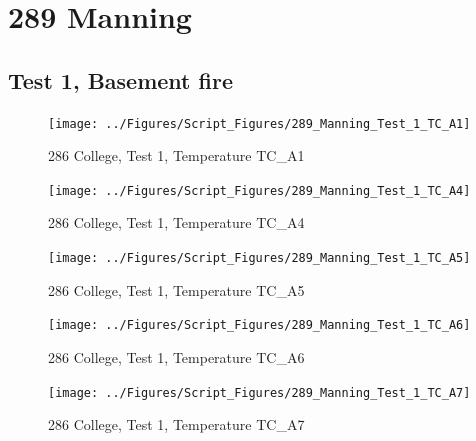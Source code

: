 \documentclass[12pt,oneside]{book}
\begin{document}



\clearpage


\section{289 Manning}

\subsection{Test 1, Basement fire}

\begin{figure}[!ht]
\texttt{[image: ../Figures/Script\_Figures/289\_Manning\_Test\_1\_TC\_A1]}
\caption{286 College, Test 1, Temperature TC\_A1}
\label{fig:289_Manning_Test_1_TC_A1}
\end{figure}

\begin{figure}[!ht]
\texttt{[image: ../Figures/Script\_Figures/289\_Manning\_Test\_1\_TC\_A4]}
\caption{286 College, Test 1, Temperature TC\_A4}
\label{fig:289_Manning_Test_1_TC_A4}
\end{figure}

\begin{figure}[!ht]
\texttt{[image: ../Figures/Script\_Figures/289\_Manning\_Test\_1\_TC\_A5]}
\caption{286 College, Test 1, Temperature TC\_A5}
\label{fig:289_Manning_Test_1_TC_A5}
\end{figure}

\begin{figure}[!ht]
\texttt{[image: ../Figures/Script\_Figures/289\_Manning\_Test\_1\_TC\_A6]}
\caption{286 College, Test 1, Temperature TC\_A6}
\label{fig:289_Manning_Test_1_TC_A6}
\end{figure}

\begin{figure}[!ht]
\texttt{[image: ../Figures/Script\_Figures/289\_Manning\_Test\_1\_TC\_A7]}
\caption{286 College, Test 1, Temperature TC\_A7}
\label{fig:289_Manning_Test_1_TC_A7}
\end{figure}
\end{document}
